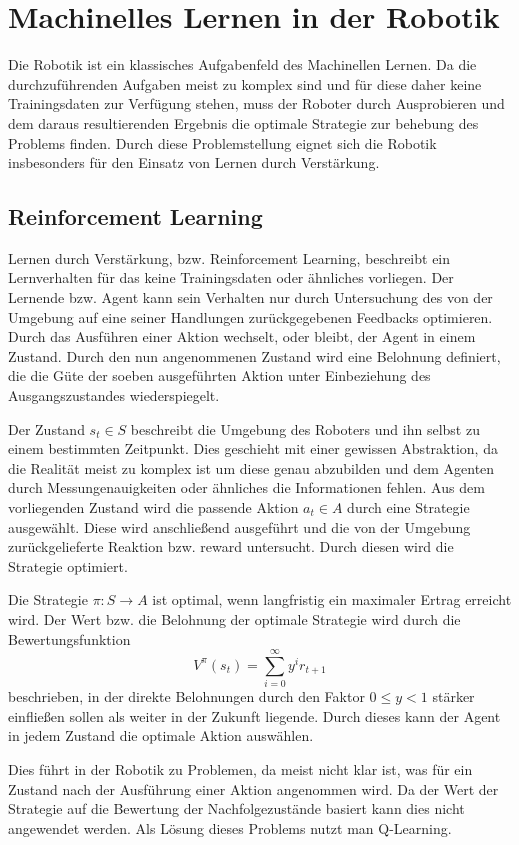 \chapter{Machinelles Lernen in der Robotik}

Die Robotik ist ein klassisches Aufgabenfeld des Machinellen Lernen. Da die durch\-zu\-führenden Aufgaben meist zu komplex sind und für diese daher keine Trainingsdaten zur Verfügung stehen, muss der Roboter durch Ausprobieren und dem daraus resultierenden Ergebnis die optimale Strategie zur behebung des Problems finden. Durch diese Problemstellung eignet sich die Robotik insbesonders für den Einsatz von Lernen durch Verstärkung. \cite{Ertel_2013}

\section{Reinforcement Learning}

Lernen durch Verstärkung, bzw. Reinforcement Learning, beschreibt ein Lernverhalten für das keine Trainingsdaten oder ähnliches vorliegen. Der Lernende bzw. Agent kann sein Verhalten nur durch Untersuchung des von der Umgebung auf eine seiner Handlungen zurückgegebenen Feedbacks optimieren. Durch das Ausführen einer Aktion wechselt, oder bleibt, der Agent in einem Zustand. Durch den nun angenommenen Zustand wird eine Belohnung definiert, die die Güte der soeben ausgeführten Aktion unter Einbeziehung des Ausgangszustandes wiederspiegelt. \cite{Ertel_2013}\par 
Der Zustand $s_t \in S$ beschreibt die Umgebung des Roboters und ihn selbst zu einem bestimmten Zeitpunkt. Dies geschieht mit einer gewissen Abstraktion, da die Realität meist zu komplex ist um diese genau abzubilden und dem Agenten durch Messungenauigkeiten oder ähnliches die Informationen fehlen. Aus dem vorliegenden Zustand wird die passende Aktion $a_t \in A$ durch eine Strategie ausgewählt. Diese wird anschließend ausgeführt und die von der Umgebung zurückgelieferte Reaktion bzw. reward untersucht. Durch diesen wird die Strategie optimiert. \cite{Ertel_2013}\par
Die Strategie $\pi: S \rightarrow A$ ist optimal, wenn langfristig ein maximaler Ertrag erreicht wird. Der Wert bzw. die Belohnung der  optimale Strategie wird durch die Bewertungsfunktion 
\begin{equation}
	V^{\pi}(s_t) = \sum_{i=0}^{\infty}y^{i}r_{t+1}
\end{equation}
\label{value_function_max}
beschrieben, in der direkte Belohnungen durch den Faktor $0 \le y < 1$ stärker einfließen sollen als weiter in der Zukunft liegende. Durch dieses kann der Agent in jedem Zustand die optimale Aktion auswählen. \cite{Ertel_2013}\par
Dies führt in der Robotik zu Problemen, da meist nicht klar ist, was für ein Zustand nach der Ausführung einer Aktion angenommen wird. Da der Wert der Strategie auf die Bewertung der Nachfolgezustände basiert kann dies nicht angewendet werden. Als Lösung dieses Problems nutzt man Q-Learning.

